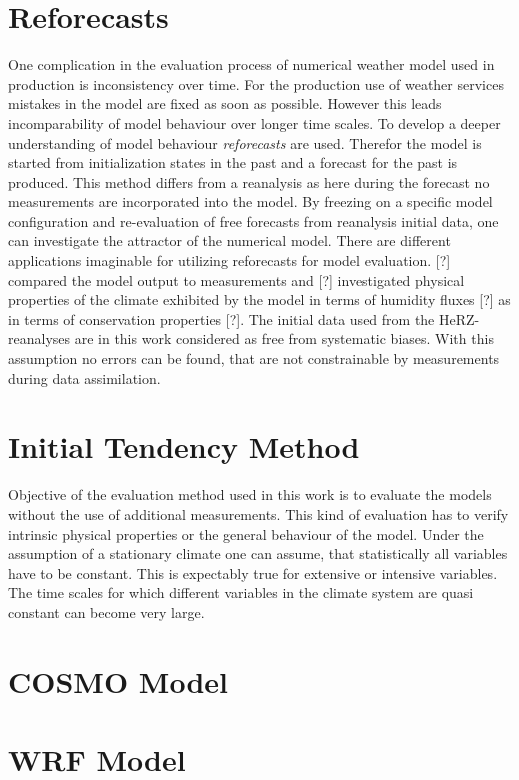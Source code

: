 \section{Reforecasts}
\p
One complication in the evaluation process of numerical weather model used in production is inconsistency over time. For the production use of weather services mistakes in the model are fixed as soon as possible. However this leads incomparability of model behaviour over longer time scales.
\p
To develop a deeper understanding of model behaviour \emph{reforecasts} are used. Therefor the model is started from initialization states in the past and a forecast for the past is produced. This method differs from a reanalysis as here during the forecast no measurements are incorporated into the model.
\p
By freezing on a specific model configuration and re-evaluation of free forecasts from reanalysis initial data, one can investigate the attractor of the numerical model.
\p
There are different applications imaginable for utilizing reforecasts for model evaluation. [?] compared the model output to measurements and [?] investigated physical properties of the climate exhibited by the model in terms of humidity fluxes [?] as in terms of conservation properties [?].
\p
The initial data used from the HeRZ-reanalyses are in this work considered as free from systematic biases. With this assumption no errors can be found, that are not constrainable by measurements during data assimilation. 
\section{Initial Tendency Method}
\p
Objective of the evaluation method used in this work is to evaluate the models without the use of additional measurements. This kind of evaluation has to verify intrinsic physical properties or the general behaviour of the model.
\p
Under the assumption of a stationary climate one can assume, that statistically all variables have to be constant. This is expectably true for extensive or intensive variables.
\p
The time scales for which different variables in the climate system are quasi constant can become very large. 
\section{COSMO Model}
\section{WRF Model}


